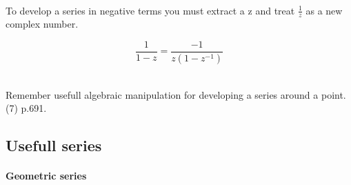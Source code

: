 \\
To develop a series in negative terms you must extract a z and treat
$\frac{1}{z}$ as a new complex number.

\begin{equation}
  \frac{1}{1-z} = \frac{-1}{z(1-z^{-1})}
\end{equation}


\\

Remember usefull algebraic manipulation for developing a series around
a point. (7) p.691.

\subsection{Usefull series}

\paragraph{Geometric series}
